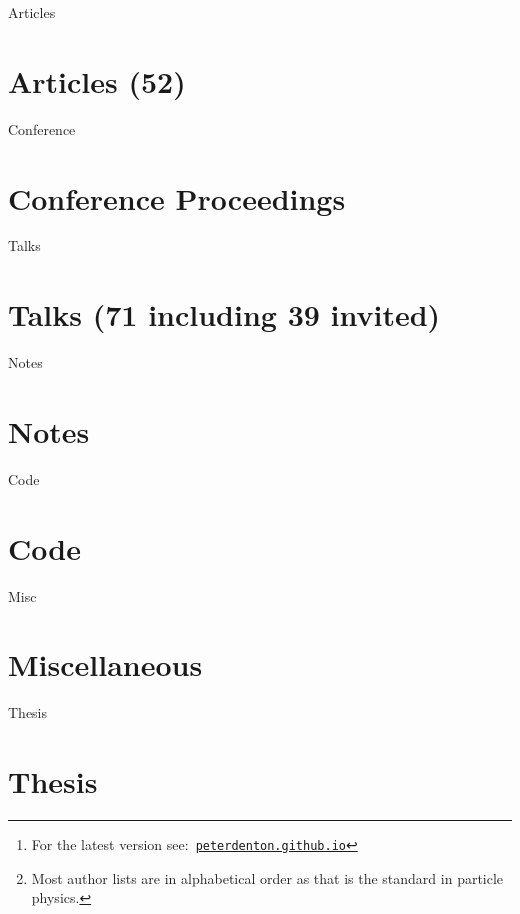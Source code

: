 \documentclass[12pt]{article}
\title{\myTitle}
\author{\myName}
\date{\small Updated: \today\footnote{For the latest version see:\ \href{http://peterdenton.github.io}{\tt peterdenton.github.io}} \footnote{Most author lists are in alphabetical order as that is the standard in particle physics.}}
\newcommand\myBib[2]{
\begin{btSect}{#2}
\section*{#1}
\btPrintAll
\end{btSect}}
\begin{document}

\maketitle



\myBib{Articles (52)}{Articles}
\myBib{Conference Proceedings}{Conference}
\myBib{Talks (71 including 39 invited)}{Talks}
\myBib{Notes}{Notes}
\myBib{Code}{Code}
\myBib{Miscellaneous}{Misc}
\myBib{Thesis}{Thesis}
\end{document}
